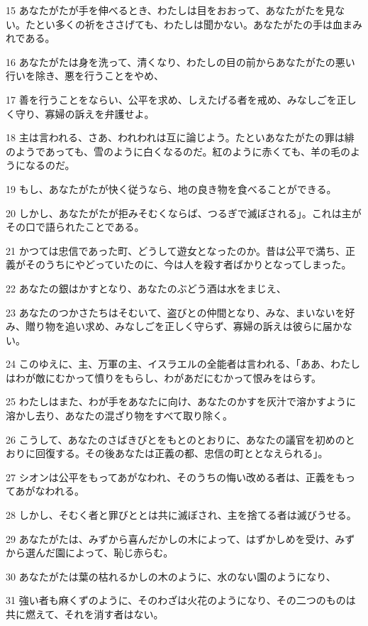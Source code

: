 \par 15 あなたがたが手を伸べるとき、わたしは目をおおって、あなたがたを見ない。たとい多くの祈をささげても、わたしは聞かない。あなたがたの手は血まみれである。
\par 16 あなたがたは身を洗って、清くなり、わたしの目の前からあなたがたの悪い行いを除き、悪を行うことをやめ、
\par 17 善を行うことをならい、公平を求め、しえたげる者を戒め、みなしごを正しく守り、寡婦の訴えを弁護せよ。
\par 18 主は言われる、さあ、われわれは互に論じよう。たといあなたがたの罪は緋のようであっても、雪のように白くなるのだ。紅のように赤くても、羊の毛のようになるのだ。
\par 19 もし、あなたがたが快く従うなら、地の良き物を食べることができる。
\par 20 しかし、あなたがたが拒みそむくならば、つるぎで滅ぼされる」。これは主がその口で語られたことである。
\par 21 かつては忠信であった町、どうして遊女となったのか。昔は公平で満ち、正義がそのうちにやどっていたのに、今は人を殺す者ばかりとなってしまった。
\par 22 あなたの銀はかすとなり、あなたのぶどう酒は水をまじえ、
\par 23 あなたのつかさたちはそむいて、盗びとの仲間となり、みな、まいないを好み、贈り物を追い求め、みなしごを正しく守らず、寡婦の訴えは彼らに届かない。
\par 24 このゆえに、主、万軍の主、イスラエルの全能者は言われる、「ああ、わたしはわが敵にむかって憤りをもらし、わがあだにむかって恨みをはらす。
\par 25 わたしはまた、わが手をあなたに向け、あなたのかすを灰汁で溶かすように溶かし去り、あなたの混ざり物をすべて取り除く。
\par 26 こうして、あなたのさばきびとをもとのとおりに、あなたの議官を初めのとおりに回復する。その後あなたは正義の都、忠信の町ととなえられる」。
\par 27 シオンは公平をもってあがなわれ、そのうちの悔い改める者は、正義をもってあがなわれる。
\par 28 しかし、そむく者と罪びととは共に滅ぼされ、主を捨てる者は滅びうせる。
\par 29 あなたがたは、みずから喜んだかしの木によって、はずかしめを受け、みずから選んだ園によって、恥じ赤らむ。
\par 30 あなたがたは葉の枯れるかしの木のように、水のない園のようになり、
\par 31 強い者も麻くずのように、そのわざは火花のようになり、その二つのものは共に燃えて、それを消す者はない。

